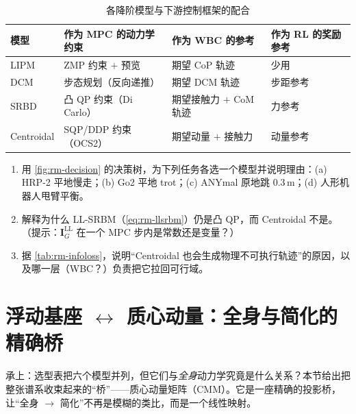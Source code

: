 \begin{table}[H]\centering\small
\caption{各降阶模型与下游控制框架的配合}
\label{tab:rm-downstream}
\begin{tabular}{llll}
\toprule
模型 & 作为 MPC 的动力学约束 & 作为 WBC 的参考 & 作为 RL 的奖励参考 \\
\midrule
LIPM       & ZMP 约束 $+$ 预览 & 期望 CoP 轨迹 & 少用 \\
DCM        & 步态规划（反向递推） & 期望 DCM 轨迹 & 步距参考 \\
SRBD       & 凸 QP 约束（Di Carlo） & 期望接触力 $+$ CoM 轨迹 & 力参考 \\
Centroidal & SQP/DDP 约束（OCS2） & 期望动量 $+$ 接触力 & 动量参考 \\
\bottomrule
\end{tabular}
\end{table}

\begin{exercise}
\begin{enumerate}
  \item 用 \cref{fig:rm-decision} 的决策树，为下列任务各选一个模型并说明理由：(a) HRP-2 平地慢走；(b) Go2 平地 trot；(c) ANYmal 原地跳 $0.3$\,m；(d) 人形机器人甩臂平衡。
  \item 解释为什么 LL-SRBM（\cref{eq:rm-llsrbm}）仍是凸 QP，而 Centroidal 不是。（提示：$\mathbf{I}_G^{\mathrm{LL}}$ 在一个 MPC 步内是常数还是变量？）
  \item 据 \cref{tab:rm-infoloss}，说明“Centroidal 也会生成物理不可执行轨迹”的原因，以及哪一层（WBC？）负责把它拉回可行域。
\end{enumerate}
\end{exercise}

\section{浮动基座 $\leftrightarrow$ 质心动量：全身与简化的精确桥}
\label{sec:rm-bridge}

承上：选型表把六个模型并列，但它们与\emph{全身}动力学究竟是什么关系？本节给出把整张谱系收束起来的“桥”——质心动量矩阵（CMM）。它是一座精确的投影桥，让“全身 $\to$ 简化”不再是模糊的类比，而是一个线性映射。


